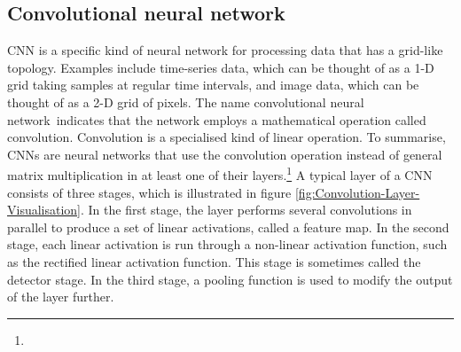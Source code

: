 \subsection{Convolutional neural network}
\label{sub:Convolutional-Neural-Network}
\Gls{CNN} is a specific kind of neural network for processing data that has a grid-like topology. Examples include time-series data, which can be thought of as a 1-D grid taking samples at regular time intervals, and image data, which can be thought of as a 2-D grid of pixels. The name \flqq convolutional neural network\frqq \ indicates that the network employs a mathematical operation called convolution. Convolution is a specialised kind of linear operation. To summarise, \glspl{CNN} are neural networks that use the convolution operation instead of general matrix multiplication in at least one of their layers.\footnote{}
\newline
\newline
A typical layer of a \gls{CNN} consists of three stages, which is illustrated in figure \ref{fig:Convolution-Layer-Visualisation}. In the first stage, the layer performs several convolutions in parallel to produce a set of linear activations, called a feature map. In the second stage, each linear activation is run through a non-linear activation function, such as the rectified linear activation function. This stage is sometimes called the detector stage. In the third stage, a pooling function is used to modify the output of the layer further.

